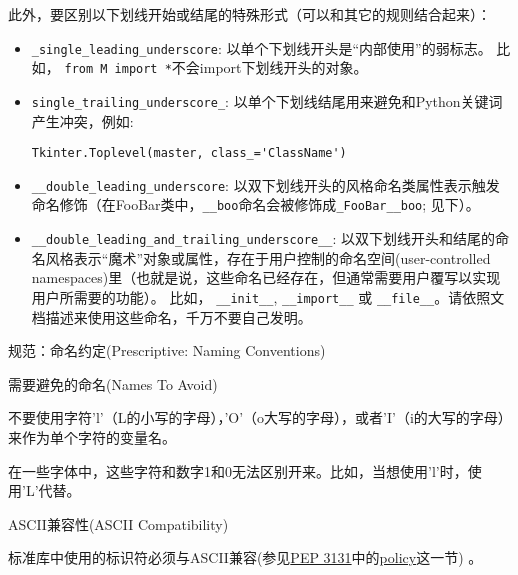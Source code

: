 \documentclass[ignorenonframetext,9pt]{beamer}
\begin{document}
\begin{frame}[fragile]

此外，要区别以下划线开始或结尾的特殊形式（可以和其它的规则结合起来）：

\begin{itemize}
\item
  \texttt{\_single\_leading\_underscore}:
  以单个下划线开头是``内部使用''的弱标志。 比如，
  \texttt{from\ M\ import\ *}不会import下划线开头的对象。
\item
  \texttt{single\_trailing\_underscore\_}:
  以单个下划线结尾用来避免和Python关键词产生冲突，例如:

\begin{verbatim}
Tkinter.Toplevel(master, class_='ClassName')
\end{verbatim}

\end{itemize}
\end{frame}

\begin{frame}[fragile]
\begin{itemize}

\item
  \texttt{\_\_double\_leading\_underscore}:
  以双下划线开头的风格命名类属性表示触发命名修饰（在FooBar类中，\texttt{\_\_boo}命名会被修饰成\texttt{\_FooBar\_\_boo};
  见下）。
\item
  \texttt{\_\_double\_leading\_and\_trailing\_underscore\_\_}:
  以双下划线开头和结尾的命名风格表示``魔术''对象或属性，存在于用户控制的命名空间(user-controlled
  namespaces)里（也就是说，这些命名已经存在，但通常需要用户覆写以实现用户所需要的功能）。
  比如， \texttt{\_\_init\_\_}, \texttt{\_\_import\_\_} 或
  \texttt{\_\_file\_\_}。请依照文档描述来使用这些命名，千万不要自己发明。
\end{itemize}

\end{frame}

\begin{frame}[fragile]

\begin{block}{规范：命名约定(Prescriptive: Naming Conventions)}

\begin{block}{需要避免的命名(Names To Avoid)}

不要使用字符'l'（L的小写的字母），'O'（o大写的字母），或者'I'（i的大写的字母）来作为单个字符的变量名。

在一些字体中，这些字符和数字1和0无法区别开来。比如，当想使用'l'时，使用'L'代替。

\end{block}

\begin{block}{ASCII兼容性(ASCII Compatibility)}

标准库中使用的标识符必须与ASCII兼容(参见\href{https://www.python.org/dev/peps/pep-3131}{PEP
3131}中的\href{https://www.python.org/dev/peps/pep-3131/\#policy-specification}{policy}这一节)
。

\end{block}
  
\end{block}
\end{frame}
\end{document}
